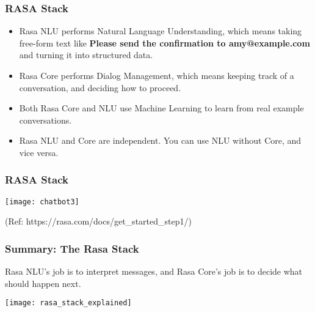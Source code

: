  \begin{frame}[fragile]\frametitle{RASA Stack}
\begin{itemize}
\item Rasa NLU performs Natural Language Understanding, which means taking free-form text like
{\bf Please send the confirmation to amy@example.com}
and turning it into structured data. 
\item Rasa Core performs Dialog Management, which means keeping track of a conversation, and deciding how to proceed. 
\item Both Rasa Core and NLU use Machine Learning to learn from real example conversations.
\item Rasa NLU and Core are independent. You can use NLU without Core, and vice versa.
\end{itemize}
\end{frame}

 \begin{frame}[fragile]\frametitle{RASA Stack}
\begin{center}
\texttt{[image: chatbot3]}
\end{center}

{\tiny (Ref: https://rasa.com/docs/get\_started\_step1/)}

\end{frame}



 \begin{frame}[fragile]\frametitle{Summary: The Rasa Stack}
Rasa NLU's job is to interpret messages, and Rasa Core's job is to decide what should happen next.

\begin{center}
\texttt{[image: rasa\_stack\_explained]}
\end{center}

\end{frame}


